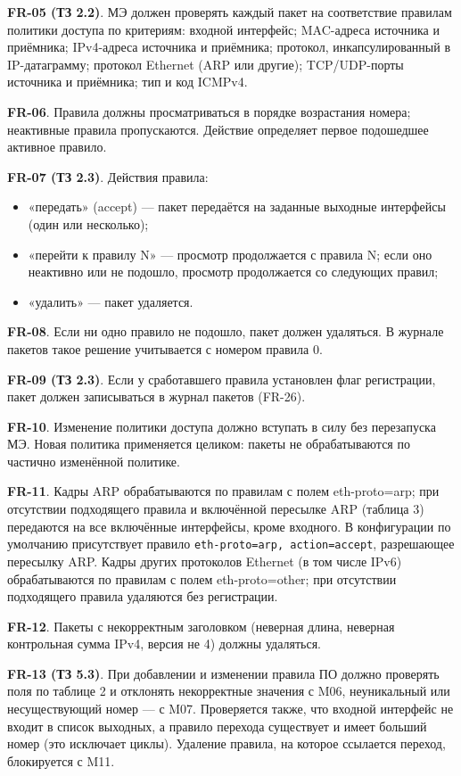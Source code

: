 \documentclass[13pt,a4paper,final]{article}
\begin{document}
	\textbf{FR-05 (ТЗ 2.2)}. МЭ должен проверять каждый пакет на соответствие правилам политики доступа по критериям: входной интерфейс; MAC-адреса источника и приёмника; IPv4-адреса источника и приёмника; протокол, инкапсулированный в IP-датаграмму; протокол Ethernet (ARP или другие); TCP/UDP-порты источника и приёмника; тип и код ICMPv4.
	
	\textbf{FR-06}. Правила должны просматриваться в порядке возрастания номера; неактивные правила пропускаются. Действие определяет первое подошедшее активное правило.
	
	\textbf{FR-07 (ТЗ 2.3)}. Действия правила:
	\begin{itemize}
		\item «передать» (accept) — пакет передаётся на заданные выходные интерфейсы (один или несколько);
		\item «перейти к правилу N» — просмотр продолжается с правила N; если оно неактивно или не подошло, просмотр продолжается со следующих правил;
		\item «удалить» — пакет удаляется.
	\end{itemize}
	
	\textbf{FR-08}. Если ни одно правило не подошло, пакет должен удаляться. В журнале пакетов такое решение учитывается с номером правила 0.
	
	\textbf{FR-09 (ТЗ 2.3)}. Если у сработавшего правила установлен флаг регистрации, пакет должен записываться в журнал пакетов (FR-26).
	
	\textbf{FR-10}. Изменение политики доступа должно вступать в силу без перезапуска МЭ. Новая политика применяется целиком: пакеты не обрабатываются по частично изменённой политике.
	
	\textbf{FR-11}. Кадры ARP обрабатываются по правилам с полем eth-proto=arp; при отсутствии подходящего правила и включённой пересылке ARP (таблица 3) передаются на все включённые интерфейсы, кроме входного. В конфигурации по умолчанию присутствует правило \texttt{eth-proto=arp, action=accept}, разрешающее пересылку ARP. Кадры других протоколов Ethernet (в том числе IPv6) обрабатываются по правилам с полем eth-proto=other; при отсутствии подходящего правила удаляются без регистрации.
	
	\textbf{FR-12}. Пакеты с некорректным заголовком (неверная длина, неверная контрольная сумма IPv4, версия не 4) должны удаляться.
	
	\textbf{FR-13 (ТЗ 5.3)}. При добавлении и изменении правила ПО должно проверять поля по таблице 2 и отклонять некорректные значения с M06, неуникальный или несуществующий номер — с M07. Проверяется также, что входной интерфейс не входит в список выходных, а правило перехода существует и имеет больший номер (это исключает циклы). Удаление правила, на которое ссылается переход, блокируется с M11.
	
\end{document}
